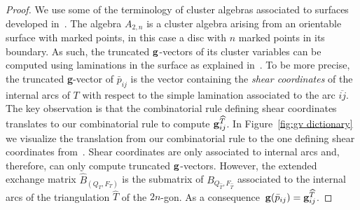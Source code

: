 \documentclass[10pt,a4paper]{amsart}
\numberwithin{equation}{section}
\begin{document}
\begin{proof}
We use some of the terminology of cluster algebras associated to surfaces developed in~\cite{fomin2018cluster}.
The algebra $A_{2,n}$ is a cluster algebra arising from an orientable surface with marked points, in this case a disc with $n$ marked points in its boundary.
As such, the truncated ${\bf g}$-vectors of its cluster variables can be computed using laminations in the surface as explained in~\cite[Proposition 17.3]{fomin2018cluster}. To be more precise, the truncated {\bf g}-vector of $\bar p_{ij}$ is the vector containing the {\it shear coordinates} of the internal arcs of $T$ with respect to the simple lamination associated to the arc $\overline{ij} $.
The key observation is that the combinatorial rule defining shear coordinates translates to our combinatorial rule to compute ${\bf g}^{\widehat T}_{ij}$.
In Figure~\ref{fig:gv dictionary} we visualize the translation from our combinatorial rule to the one defining shear coordinates from~\cite[Definition~12.2, Figure~34]{fomin2018cluster}.
Shear coordinates are only associated to internal arcs and, therefore, can only compute truncated ${\bf g}$-vectors.
However, the extended exchange matrix $\widehat{B}_{(Q_T,F_T)}$ is the submatrix of $B_{Q_{\widehat T},F_{\widehat T}}$ associated to the internal arcs of the triangulation $\widehat T$ of the $2n$-gon.
As a conse\-qu\-ence~${\bf g}(\bar p_{ij})={\bf g}^{\widehat T}_{ij}$.
\end{proof}
\end{document}
